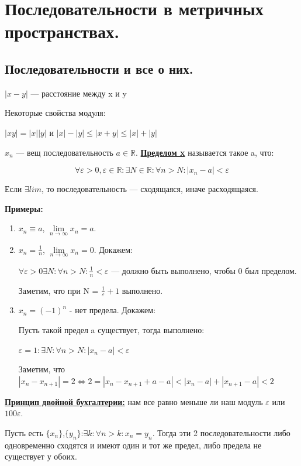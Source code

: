 \documentclass{article}
\newcommand{\deff}[1]{\underline{\textbf{#1}}}
\begin{document}
\pagebreak
\section{Последовательности в метричных пространствах.}

\subsection{Последовательности и все о них.}

$|x-y|$ --- расстояние между x и y

Некоторые свойства модуля: 

$|xy|=|x||y|$ и $|x|-|y|\leq |x+y| \leq |x|+|y|$

$x_n$ --- вещ последовательность $a \in \mathds{R}$. \deff{Пределом x} называется такое a, что:

\[\forall \varepsilon > 0, \varepsilon \in \mathds{R}: \exists N \in \mathds{R}: \forall n >N:|x_n-a|<\varepsilon \]

Если $ \exists lim$, то последовательность --- сходящаяся, иначе расходящаяся.

\textbf{Примеры:}

\begin{enumerate}
    \item $x_n \equiv a$, $\lim\limits_{n\to \infty}x_n =a$. 

    \item $x_n = \frac{1}{n}$, $\lim\limits_{n\to \infty}x_n =0$. Докажем:

    
$\forall \varepsilon > 0 \exists N: \forall n> N: \frac{1}{n} < \varepsilon$ --- должно быть выполнено, чтобы 0 был пределом.

Заметим, что при N = $\frac{1}{\varepsilon} +1$ выполнено.

    \item $x_n = (-1)^n$ - нет предела. Докажем:
    
Пусть такой предел a существует, тогда выполнено:

$\varepsilon = 1: \exists N: \forall n > N: |x_n-a|<\varepsilon$

Заметим, что $|x_n-x_{n+1}| =2 \Leftrightarrow 2 = |x_n-x_{n+1} +a - a| <|x_n-a| +|x_{n+1}-a| < 2$ 
\end{enumerate}


\deff{Принцип двойной бухгалтерии:} нам все равно меньше ли наш модуль $\varepsilon$ или $100\varepsilon$.

Пусть есть $\{x_n\}$,$\{y_n\}$:$\exists k: \forall n>k: x_n=y_n$. Тогда эти 2 последовательности либо одновременно сходятся и имеют один и тот же предел, либо предела не существует  у обоих.
\end{document}
